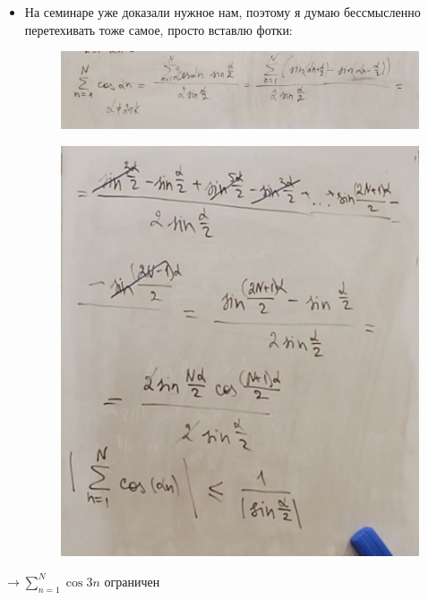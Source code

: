 \documentclass[a4paper,12pt]{article}
\begin{document}
\begin{itemize}
\item На семинаре уже доказали нужное нам, поэтому я думаю бессмысленно перетехивать тоже самое, просто вставлю фотки:
\begin{figure}[h]
\centering
\includegraphics[scale=0.4]{2.png}
\end{figure}
\begin{figure}[h]
\centering
\includegraphics[scale=0.3]{3.png}
\end{figure}
\end{itemize}
\begin{center}
$\rightarrow \sum\limits_{n = 1}^{N} \cos 3n $ ограничен 
\end{center}
\clearpage
\end{document}
